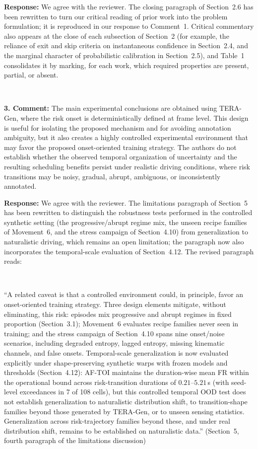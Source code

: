 \documentclass[1p,12pt,authoryear]{elsarticle}
\begin{document}
\vspace{2mm}
\noindent \textbf{Response:} We agree with the reviewer. The closing paragraph of Section~2.6 has been rewritten to turn our critical reading of prior work into the problem formulation; it is reproduced in our response to Comment~1. Critical commentary also appears at the close of each subsection of Section~2 (for example, the reliance of exit and skip criteria on instantaneous confidence in Section~2.4, and the marginal character of probabilistic calibration in Section~2.5), and Table~1 consolidates it by marking, for each work, which required properties are present, partial, or absent.

~

\noindent \textbf{3. Comment:} The main experimental conclusions are obtained using TERA-Gen, where the risk onset is deterministically defined at frame level. This design is useful for isolating the proposed mechanism and for avoiding annotation ambiguity, but it also creates a highly controlled experimental environment that may favor the proposed onset-oriented training strategy. The authors do not establish whether the observed temporal organization of uncertainty and the resulting scheduling benefits persist under realistic driving conditions, where risk transitions may be noisy, gradual, abrupt, ambiguous, or inconsistently annotated.

\vspace{2mm}
\noindent \textbf{Response:} We agree with the reviewer. The limitations paragraph of Section~5 has been rewritten to distinguish the robustness tests performed in the controlled synthetic setting (the progressive/abrupt regime mix, the unseen recipe families of Movement~6, and the stress campaign of Section~4.10) from generalization to naturalistic driving, which remains an open limitation; the paragraph now also incorporates the temporal-scale evaluation of Section~4.12. The revised paragraph reads:

~

``A related caveat is that a controlled environment could, in principle, favor an onset-oriented training strategy. Three design elements mitigate, without eliminating, this risk: episodes mix progressive and abrupt regimes in fixed proportion (Section~3.1); Movement~6 evaluates recipe families never seen in training; and the stress campaign of Section~4.10 spans nine onset/noise scenarios, including degraded entropy, lagged entropy, missing kinematic channels, and false onsets. Temporal-scale generalization is now evaluated explicitly under shape-preserving synthetic warps with frozen models and thresholds (Section~4.12): AF-TOI maintains the duration-wise mean FR within the operational bound across risk-transition durations of $0.21$--$5.21$\,s (with seed-level exceedances in 7 of 108 cells), but this controlled temporal OOD test does not establish generalization to naturalistic distribution shift, to transition-shape families beyond those generated by TERA-Gen, or to unseen sensing statistics. Generalization across risk-trajectory families beyond these, and under real distribution shift, remains to be established on naturalistic data.'' (Section~5, fourth paragraph of the limitations discussion)
\end{document}
